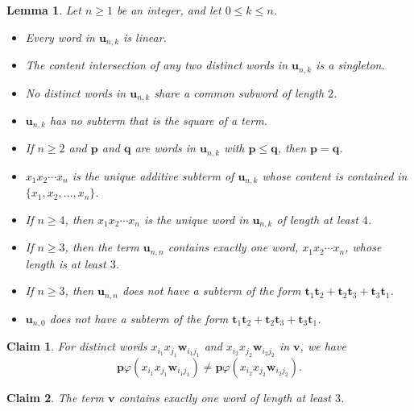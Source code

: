 \documentclass[10pt,a4paper]{amsart}
\newtheorem{lem}{Lemma}
\newtheorem{claim}{Claim}
\newcommand{\bp}{\mathbf{p}}
\newcommand{\bq}{\mathbf{q}}
\newcommand{\bt}{\mathbf{t}}
\newcommand{\bu}{\mathbf{u}}
\newcommand{\bv}{\mathbf{v}}
\newcommand{\bw}{\mathbf{w}}
\begin{document}
\begin{lem}\label{lem26011801}
Let $n\geq 1$ be an integer, and let $0\leq k\leq n$.
\begin{itemize}
\item[(a)] Every word in $\bu_{n,k}$ is linear.

\item[(b)] The content intersection of any two distinct words in $\bu_{n,k}$ is a singleton.

\item[(c)] No distinct words in $\bu_{n,k}$ share a common subword of length $2$.

\item[(d)] $\bu_{n,k}$ has no subterm that is the square of a term.

\item[(e)] If $n\geq 2$ and $\bp$ and $\bq $ are words in $\bu_{n,k}$ with $\bp \leq\bq$, then $\bp=\bq$.

\item[(f)] $x_1x_2\cdots x_n$ is the unique additive subterm of $\bu_{n,k}$
whose content is contained in $\{x_1, x_2, \ldots, x_n\}$.

\item[(g)] If $n\geq 4$, then $x_1x_2\cdots x_n$ is the unique word in $\bu_{n, k}$ of length at least $4$.

\item[(h)]
If $n\geq 3$, then
the term $\bu_{n, n}$ contains exactly one word, $x_1x_2\cdots x_n$, whose length is at least $3$.

\item[(i)]
If $n\geq 3$, then
$\bu_{n, n}$ does not have a subterm of the form $\bt_1\bt_2+\bt_2\bt_3+\bt_3\bt_1$.

\item[(j)]
$\bu_{n, 0}$ does not have a subterm of the form $\bt_1\bt_2+\bt_2\bt_3+\bt_3\bt_1$.
\end{itemize}
\end{lem}

\begin{claim}\label{claimqj01}
For distinct words $x_{i_1}x_{j_1}\bw_{i_1j_1}$ and $x_{i_2}x_{j_2}\bw_{i_2j_2}$ in $\bv$,
we have
\[
\bp\varphi(x_{i_1}x_{j_1}\bw_{i_1j_1})\neq\bp\varphi(x_{i_2}x_{j_2}\bw_{i_2j_2}).
\]
\end{claim}

\begin{claim}\label{claimqj02}
The term $\bv$ contains exactly one word of length at least $3$.
\end{claim}
\end{document}
